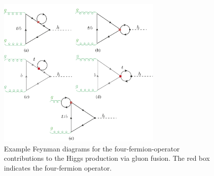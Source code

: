 	\begin{figure}[t]
		\begin{center}
			\includegraphics[width=8cm]{fig/ggF-4F_NLO.pdf}
			\caption{Example Feynman diagrams for the four-fermion-operator contributions to the Higgs production via gluon fusion. The red box indicates the four-fermion operator.\label{fig:ggh} }
		\end{center}
	\end{figure}
